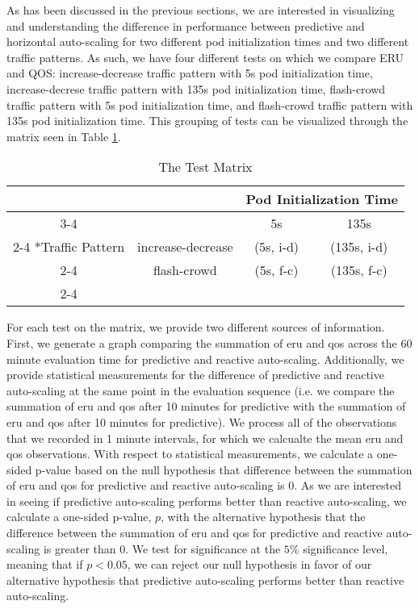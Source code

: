 As has been discussed in the previous sections, we are interested in visualizing
and understanding the difference in performance between predictive and
horizontal auto-scaling for two different pod initialization times and two
different traffic patterns. As such, we have four different tests on which we
compare ERU and QOS: increase-decrease traffic pattern with 5s pod
initialization time, increase-decrese traffic pattern with 135s pod
initialization time, flash-crowd traffic pattern with 5s pod initialization
time, and flash-crowd traffic pattern with 135s pod initialization time. This
grouping of tests can be visualized through the matrix seen in Table
\ref{tab:testmatrix}.

\begin{table}
  \setlength{\extrarowheight}{2pt}
  \begin{tabular}{*{4}{c|}}
    \multicolumn{2}{c}{} & \multicolumn{2}{c}{Pod Initialization Time}\\\cline{3-4}
    \multicolumn{1}{c}{} &  & 5s  & 135s \\\cline{2-4}
    \multirow{2}*{Traffic Pattern}  & increase-decrease & (5s, i-d) & (135s, i-d) \\\cline{2-4}
    & flash-crowd & (5s, f-c) & (135s, f-c) \\\cline{2-4}
  \end{tabular}
  \caption{The Test Matrix}
  \label{tab:testmatrix}
\end{table}

For each test on the matrix, we provide two different sources of information.
First, we generate a graph comparing the summation of eru and qos across the 60
minute evaluation time for predictive and reactive auto-scaling. Additionally,
we provide statistical measurements for the difference of predictive and
reactive auto-scaling at the same point in the evaluation sequence (i.e. we
compare the summation of eru and qos after 10 minutes for predictive with the
summation of eru and qos after 10 minutes for predictive). We process all of the
observations that we recorded in 1 minute intervals, for which we calcualte the
mean eru and qos observations. With respect to statistical measurements, we
calculate a one-sided p-value based on the null hypothesis that difference
between the summation of eru and qos for predictive and reactive auto-scaling is
$0$. As we are interested in seeing if predictive auto-scaling performs better
than reactive auto-scaling, we calculate a one-sided p-value, $p$, with the alternative
hypothesis that the difference between the summation of eru and qos for
predictive and reactive auto-scaling is greater than $0$. We test for
significance at the $5\%$ significance level, meaning that if $p < 0.05$, we can
reject our null hypothesis in favor of our alternative hypothesis that
predictive auto-scaling performs better than reactive auto-scaling.

